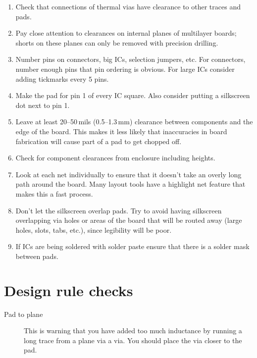\begin{enumerate}
\item Check that connections of thermal vias have clearance to other
  traces and pads.

\item Pay close attention to clearances on internal planes of
  multilayer boards; shorts on these planes can only be removed with
  precision drilling.
  
\item Number pins on connectors, big ICs, selection jumpers, etc. For
  connectors, number enough pins that pin ordering is obvious. For
  large ICs consider adding tickmarks every 5 pins.
  
\item Make the pad for pin 1 of every IC square. Also consider putting
  a silkscreen dot next to pin 1.

\item Leave at least 20--50\,mils (0.5--1.3\,mm) clearance between
  components and the edge of the board. This makes it less likely that
  inaccuracies in board fabrication will cause part of a pad to get
  chopped off.
  
\item Check for component clearances from enclosure including heights.
  
\item Look at each net individually to ensure that it doesn't take an
  overly long path around the board. Many layout tools have a
  highlight net feature that makes this a fast process.
  
\item Don't let the silkscreen overlap pads. Try to avoid having
  silkscreen overlapping via holes or areas of the board that will be
  routed away (large holes, slots, tabs, etc.), since legibility will
  be poor.
  
\item If ICs are being soldered with solder paste ensure that there is
  a solder mask between pads.
 \end{enumerate}



\section{Design rule checks}

\begin{description}
\item [Pad to plane] This is warning that you have added too much
  inductance by running a long trace from a plane via a via.  You
  should place the via closer to the pad.

  
\end{description}
